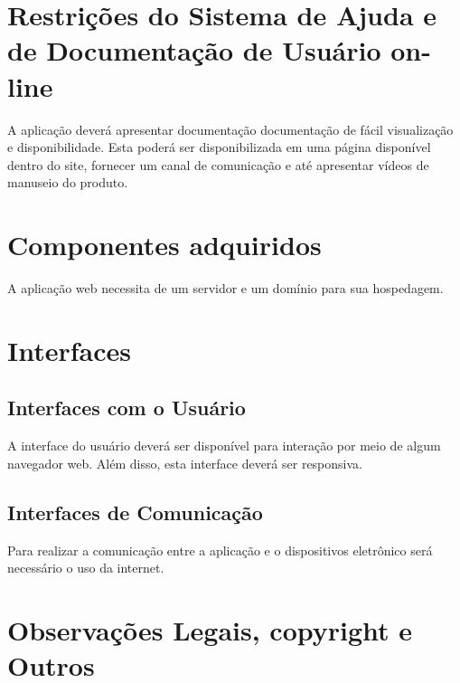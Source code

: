 \begin{apendicesenv}
{\large {\section { Restrições do Sistema de Ajuda e de Documentação de Usuário on-line \\ } } }

A aplicação deverá apresentar documentação documentação de fácil visualização e disponibilidade. Esta poderá ser disponibilizada em uma página disponível dentro do site, fornecer um canal de comunicação e  até apresentar vídeos de manuseio do produto.\\

{\large {\section { Componentes adquiridos \\ } } }

A aplicação web necessita de um servidor e um domínio para sua hospedagem.\\

{\large {\section { Interfaces \\ } } }

{\subsection {Interfaces com o Usuário\\ }}

A interface do usuário deverá ser disponível para interação por meio de algum navegador web. Além disso, esta interface deverá ser responsiva.\\

{\subsection {Interfaces de Comunicação\\ }}

Para realizar a comunicação entre a aplicação e o dispositivos eletrônico será necessário o uso da internet.\\

{\large {\section { Observações Legais, copyright e Outros  \\ } } }


\end{apendicesenv}
